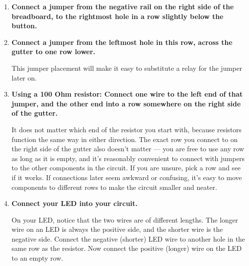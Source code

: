 \begin{enumerate}
	\item \textbf{Connect a jumper from the negative rail on the right side of the breadboard, to the rightmost hole in a row slightly below the button.}
	\item \textbf{Connect a jumper from the leftmost hole in this row, across the gutter to one row lower.}
	
	This jumper placement will make it easy to substitute a relay for the jumper later on. 
	\item \textbf{Using a 100 Ohm resistor: Connect one wire to the left end of that jumper, and the other end into a row somewhere on the right side of the gutter.} 
	
	It does not matter which end of the resistor you start with, because resistors function the same way in either direction. 
	The exact row you connect to on the right side of the gutter also doesn't matter --- you are free to use any row as long as it is empty, and it's reasonably convenient to connect with jumpers to the other components in the circuit. 
	If you are unsure, pick a row and see if it works. 
	If connections later seem awkward or confusing, it's easy to move components to different rows to make the circuit smaller and neater.
	
	
	
	\item \textbf{Connect your LED into your circuit.}
	
	On your LED, notice that the two wires are of different lengths. The longer wire on an LED is always the positive side, and the shorter wire is the negative side. Connect the negative (shorter) LED wire to another hole in the same row as the resistor. Now connect the positive (longer) wire on the LED to an empty row. 
	

\end{enumerate}
